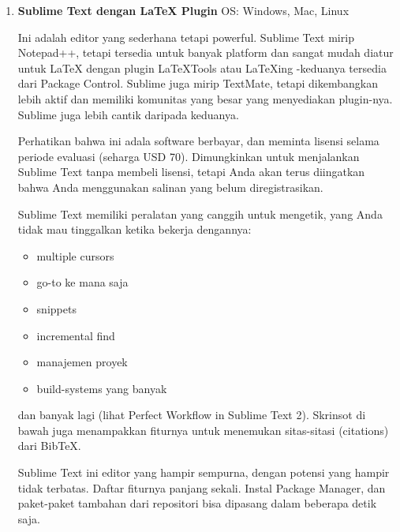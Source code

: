 \documentclass[12pt,a4paper]{article}
\begin{document}
\begin{enumerate}
\item \textbf{Sublime Text dengan LaTeX Plugin}
\setcounter{numberedCntE}{\theenumi}
\hspace{0,2in}OS: Windows, Mac, Linux

Ini adalah editor yang sederhana tetapi powerful. Sublime Text mirip Notepad++, tetapi tersedia untuk banyak platform dan sangat mudah diatur untuk LaTeX dengan plugin LaTeXTools atau LaTeXing -keduanya tersedia dari Package Control. Sublime juga mirip TextMate, tetapi dikembangkan lebih aktif dan memiliki komunitas yang besar yang menyediakan plugin-nya. Sublime juga lebih cantik daripada keduanya.
\par \vspace{12pt}

Perhatikan bahwa ini adala software berbayar, dan meminta lisensi selama periode evaluasi (seharga USD 70). Dimungkinkan untuk menjalankan Sublime Text tanpa membeli lisensi, tetapi Anda akan terus diingatkan bahwa Anda menggunakan salinan yang belum diregistrasikan.
\par \vspace{12pt}


Sublime Text memiliki peralatan yang canggih untuk mengetik, yang Anda tidak mau tinggalkan ketika bekerja dengannya:

\begin{itemize}
\item multiple cursors
\item go-to ke mana saja
\item snippets
\item incremental find
\item manajemen proyek
\item build-systems yang banyak
\end{itemize}
dan banyak lagi (lihat Perfect Workflow in Sublime Text 2). Skrinsot di bawah juga menampakkan fiturnya untuk menemukan sitas-sitasi (citations) dari BibTeX.
\par \vspace{12pt}

Sublime Text ini editor yang hampir sempurna, dengan potensi yang hampir tidak terbatas. Daftar fiturnya panjang sekali. Instal Package Manager, dan paket-paket tambahan dari repositori bisa dipasang dalam beberapa detik saja.


\end{enumerate}
\end{document}
